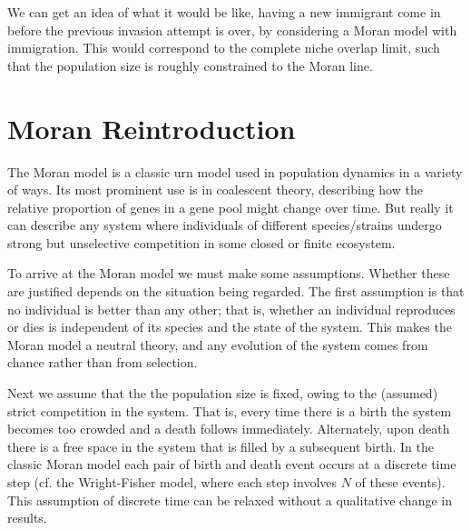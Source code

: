 We can get an idea of what it would be like, having a new immigrant come in before the previous invasion attempt is over, by considering a Moran model with immigration. 
This would correspond to the complete niche overlap limit, such that the population size is roughly constrained to the Moran line. 



\section{Moran Reintroduction}
The Moran model \cite{Moran1962} is a classic urn model used in population dynamics in a variety of ways.
Its most prominent use is in coalescent theory, describing how the relative proportion of genes in a gene pool might change over time. 
But really it can describe any system where individuals of different species/strains undergo strong but unselective competition in some closed or finite ecosystem.

To arrive at the Moran model we must make some assumptions.
Whether these are justified depends on the situation being regarded.
The first assumption is that no individual is better than any other; that is, whether an individual reproduces or dies is independent of its species and the state of the system.
This makes the Moran model a neutral theory, and any evolution of the system comes from chance rather than from selection.

Next we assume that the the population size is fixed, owing to the (assumed) strict competition in the system.
That is, every time there is a birth the system becomes too crowded and a death follows immediately. Alternately, upon death there is a free space in the system that is filled by a subsequent birth.
In the classic Moran model each pair of birth and death event occurs at a discrete time step (cf. the Wright-Fisher model, where each step involves $N$ of these events).
This assumption of discrete time can be relaxed without a qualitative change in results.


